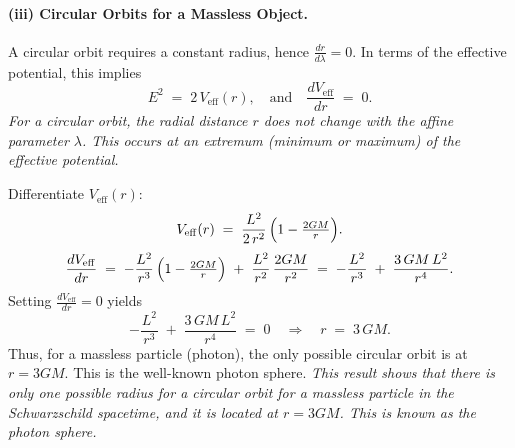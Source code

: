 \paragraph{(iii) Circular Orbits for a Massless Object.}
A circular orbit requires a constant radius, hence
\(\tfrac{dr}{d\lambda} = 0\). In terms of the effective potential, this implies
\begin{equation}
E^2 \;=\; 2\,V_\mathrm{eff}(r),
\quad\text{and}\quad
\frac{dV_\mathrm{eff}}{dr}\;=\;0.
\end{equation}
\textit{For a circular orbit, the radial distance $r$ does not change with the affine parameter $\lambda$. This occurs at an extremum (minimum or maximum) of the effective potential.}

Differentiate \(V_\mathrm{eff}(r)\):
\begin{equation}
V_\mathrm{eff}(r)
\;=\;
\frac{L^2}{2\,r^2}\,\Bigl(1 - \tfrac{2GM}{r}\Bigr).
\end{equation}
\begin{equation}
\frac{dV_\mathrm{eff}}{dr}
\;=\;
-\frac{L^2}{r^3}\,\Bigl(1 - \tfrac{2GM}{r}\Bigr)
\;+\;
\frac{L^2}{r^2}\,\frac{2GM}{r^2}
\;=\;
-\frac{L^2}{\,r^3\,}
\;+\;
\frac{3\,GM\,L^2}{\,r^4\,}.
\end{equation}
Setting \(\tfrac{dV_\mathrm{eff}}{dr} = 0\) yields
\begin{equation}
-\frac{L^2}{\,r^3\,}
\;+\;
\frac{3\,GM\,L^2}{\,r^4\,}
\;=\; 0
\quad\Longrightarrow\quad
r \;=\; 3\,GM.
\end{equation}
Thus, for a massless particle (photon), the only possible circular orbit is at \(r = 3GM\). This is the well-known photon sphere.
\textit{This result shows that there is only one possible radius for a circular orbit for a massless particle in the Schwarzschild spacetime, and it is located at $r = 3GM$. This is known as the photon sphere.}

